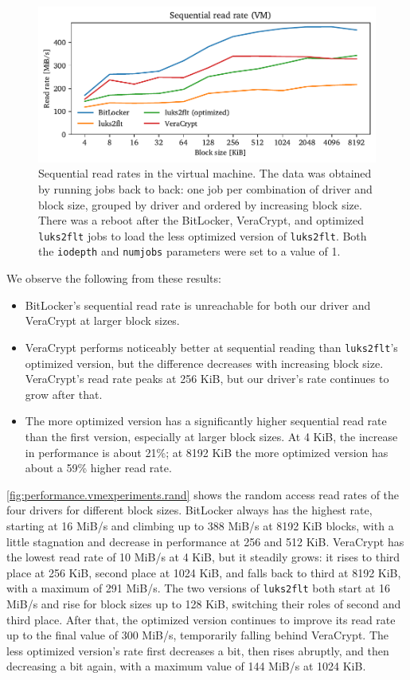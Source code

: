 \begin{figure}[htb!]
	\center
	\includegraphics[scale=1]{../fig/performance.vmexperiments.seq.pdf}
	\caption[
		Sequential read rates in the virtual machine
	]{
		Sequential read rates in the virtual machine. The data was obtained by running jobs back to back: one job per combination of driver and block size, grouped by driver and ordered by increasing block size. There was a reboot after the BitLocker, VeraCrypt, and optimized \texttt{luks2flt} jobs to load the less optimized version of \texttt{luks2flt}. Both the \texttt{iodepth} and \texttt{numjobs} parameters were set to a value of 1.
	}
	\label{fig:performance.vmexperiments.seq}
\end{figure}

We observe the following from these results:
\begin{itemize}
	\item BitLocker's sequential read rate is unreachable for both our driver and VeraCrypt at larger block sizes. 
	\item VeraCrypt performs noticeably better at sequential reading than \texttt{luks2flt}'s optimized version, but the difference decreases with increasing block size. VeraCrypt's read rate peaks at 256 KiB, but our driver's rate continues to grow after that.
	\item The more optimized version has a significantly higher sequential read rate than the first version, especially at larger block sizes. At 4 KiB, the increase in performance is about 21\%; at 8192 KiB the more optimized version has about a 59\% higher read rate.
\end{itemize}

\autoref{fig:performance.vmexperiments.rand} shows the random access read rates of the four drivers for different block sizes. BitLocker always has the highest rate, starting at 16 MiB/s and climbing up to 388 MiB/s at 8192 KiB blocks, with a little stagnation and decrease in performance at 256 and 512 KiB. VeraCrypt has the lowest read rate of 10 MiB/s at 4 KiB, but it steadily grows: it rises to third place at 256 KiB, second place at 1024 KiB, and falls back to third at 8192 KiB, with a maximum of 291 MiB/s. The two versions of \texttt{luks2flt} both start at 16 MiB/s and rise for block sizes up to 128 KiB, switching their roles of second and third place. After that, the optimized version continues to improve its read rate up to the final value of 300 MiB/s, temporarily falling behind VeraCrypt. The less optimized version's rate first decreases a bit, then rises abruptly, and then decreasing a bit again, with a maximum value of 144 MiB/s at 1024 KiB.

